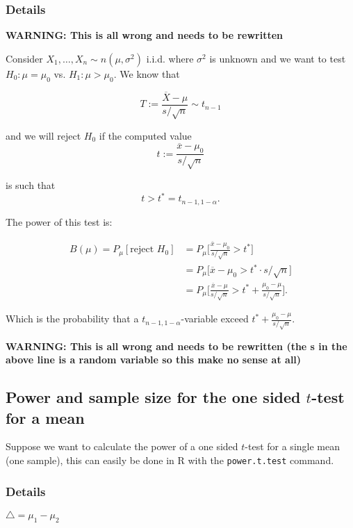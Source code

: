 \documentclass[12pt,a4paper]{article}
\theoremstyle{regla}
\theoremstyle{remark}
\theoremstyle{definition}
\theoremstyle{nonumberbreak}
\begin{document}
\subsubsection{Details}
\Large{\textbf{WARNING: This is all wrong and needs to be rewritten}}

Consider $X_1,\ldots,X_n \sim n (\mu, \sigma^2)$ i.i.d. where $\sigma^2$ is unknown and we want to test $H_0:\mu = \mu_0$ vs. $H_1: \mu > \mu_0$.  We know that

$$T:= \frac{\overline{X} - \mu}{s/\sqrt{n}} \sim t_{n-1}$$

and we will reject $H_0$ if the computed value $$t:= \frac{\overline{x} - \mu_0}{s/\sqrt{n}}$$

is such that $$t>t^{\ast}=t_{n-1, 1-\alpha}.$$

The power of this test is:

\begin{align*}
B(\mu) = P_{\mu}[\text{reject } H_0] &= P_{\mu} \lbrack \frac{\overline{x} - \mu_0}{s/\sqrt{n}} > t^\ast \rbrack\\
&=P_{\mu} \lbrack \overline{x} - \mu_0 > t^\ast\cdot s/\sqrt{n} \rbrack\\
&=P_{\mu} \lbrack \frac{\overline{x} - \mu}{s/\sqrt{n}} > t^\ast+\frac{\mu_0-\mu}{s/\sqrt{n}} \rbrack.
\end{align*}

Which is the probability that a  $t_{n-1,1-\alpha}$-variable exceed $t^{\ast}+\frac{\mu_0-\mu}{s/\sqrt{n}}$.

\Large{\textbf{WARNING: This is all wrong and needs to be rewritten (the s in the above line is a random variable so this make no sense at all)}}




\subsection{Power and sample size for the one sided $t$-test for a mean}
\begin{fbox}
\begin{minipage}{0.97\textwidth}
Suppose we want to calculate the power of a one sided $t$-test for a single mean (one sample), this can easily be done in R with the \texttt{power.t.test} command.
\end{minipage}
\end{fbox}
\subsubsection{Details}
$\triangle = \mu_1-\mu_2$\\
\end{document}

